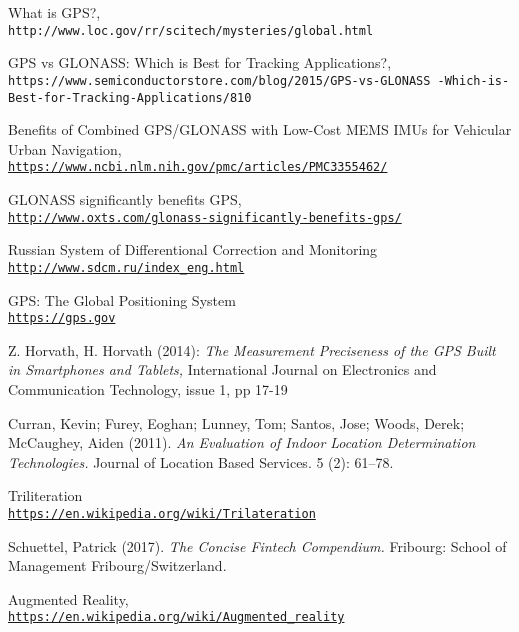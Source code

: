 \newpage
{}


\begin{thebibliography}{9}
What is GPS?,
\\\texttt{http://www.loc.gov/rr/scitech/mysteries/global.html}

GPS vs GLONASS: Which is Best for Tracking Applications?,
\\\texttt{https://www.semiconductorstore.com/blog/2015/GPS-vs-GLONASS
-Which-is-Best-for-Tracking-Applications/810}

Benefits of Combined GPS/GLONASS with Low-Cost MEMS IMUs for Vehicular Urban Navigation,
\\\texttt{\url{https://www.ncbi.nlm.nih.gov/pmc/articles/PMC3355462/}}

GLONASS significantly benefits GPS,
\\\texttt{\url{http://www.oxts.com/glonass-significantly-benefits-gps/}}

Russian System of Differentional Correction and Monitoring
\\\texttt{\url{http://www.sdcm.ru/index_eng.html}}

GPS: The Global Positioning System
\\\texttt{\url{https://gps.gov}}

Z. Horvath, H. Horvath (2014): 
\textit{The Measurement Preciseness of the GPS Built in Smartphones and Tablets,} International Journal on Electronics and Communication Technology, issue 1, pp 17-19

Curran, Kevin; Furey, Eoghan; Lunney, Tom; Santos, Jose; Woods, Derek; McCaughey, Aiden (2011). 
\textit{An Evaluation of Indoor Location Determination Technologies.}
Journal of Location Based Services. 5 (2): 61–78.

Triliteration
\\\texttt{\url{https://en.wikipedia.org/wiki/Trilateration}}

Schuettel, Patrick (2017). 
\textit{The Concise Fintech Compendium.} Fribourg: School of Management Fribourg/Switzerland.

Augmented Reality,
\\\texttt{\url{https://en.wikipedia.org/wiki/Augmented_reality}}


\end{thebibliography}
